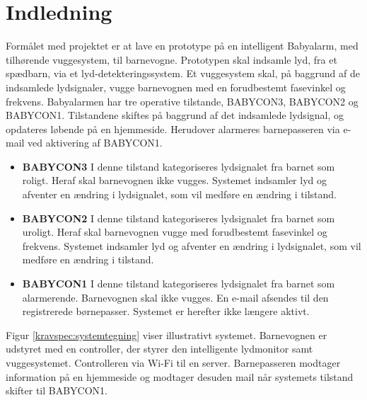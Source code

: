 \section{Indledning}

Formålet med projektet er at lave en prototype på en intelligent Babyalarm, med tilhørende vuggesystem, til barnevogne. Prototypen skal indsamle lyd, fra et spædbarn, via et lyd-detekteringssystem. Et vuggesystem skal, på baggrund af de indsamlede lydsignaler, vugge barnevognen med en forudbestemt fasevinkel og frekvens. Babyalarmen har tre operative tilstande, BABYCON3, BABYCON2 og BABYCON1. Tilstandene skiftes på baggrund af det indsamlede lydsignal, og opdateres løbende på en hjemmeside. Herudover alarmeres barnepasseren via e-mail ved aktivering af BABYCON1. 
\begin{itemize}
\item \textbf{BABYCON3} 
\newline I denne tilstand kategoriseres lydsignalet fra barnet som roligt. Heraf skal barnevognen ikke vugges. Systemet indsamler lyd og afventer en ændring i lydsignalet, som vil medføre en ændring i tilstand. 
\item \textbf{BABYCON2}
\newline I denne tilstand kategoriseres lydsignalet fra barnet som uroligt. Heraf skal barnevognen vugge med forudbestemt fasevinkel og frekvens. Systemet indsamler lyd og afventer en ændring i lydsignalet, som vil medføre en ændring i tilstand. 

\item \textbf{BABYCON1}
\newline I denne tilstand kategoriseres lydsignalet fra barnet som alarmerende. Barnevognen skal ikke vugges. En e-mail afsendes til den registrerede børnepasser. Systemet er herefter ikke længere aktivt. 
\end{itemize}
 

Figur \ref{kravspec:systemtegning} viser illustrativt systemet. Barnevognen er udstyret med en controller, der styrer den intelligente lydmonitor samt vuggesystemet. Controlleren  via Wi-Fi til en server. Barnepasseren modtager information på en hjemmeside og modtager desuden mail når systemets tilstand skifter til BABYCON1.